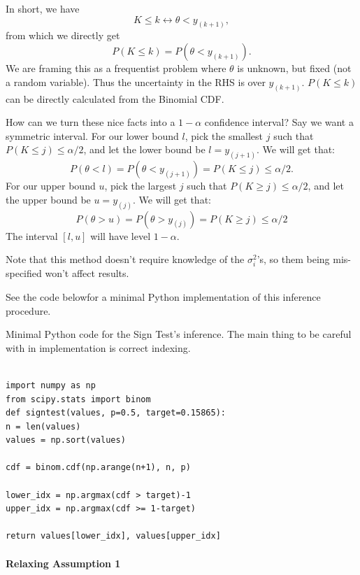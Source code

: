 \documentclass[12pt]{article}
\begin{document}
In short, we have
\begin{equation*}K\leq k\leftrightarrow \theta< y_{(k+1)},\end{equation*}
from which we directly get
\begin{equation*}P(K\leq k)=P(\theta<y_{(k+1)}).\end{equation*}
We are framing this as a frequentist problem where $\theta$ is unknown, but fixed (not a random variable). Thus the uncertainty in the RHS is over $y_{(k+1)}$. $P(K\leq k)$ can be directly calculated from the Binomial CDF.

How can we turn these nice facts into a $1-\alpha$ confidence interval? Say we want a symmetric interval. For our lower bound $l$, pick the smallest $j$ such that $P(K\leq j)\leq \alpha/2$, and let the lower bound be $l=y_{(j+1)}$. We will get that:
\begin{equation*}P(\theta<l)=P(\theta<y_{(j+1)})=P(K\leq j)\leq \alpha/2 .\end{equation*}
For our upper bound $u$, pick the largest $j$ such that $P(K\geq j)\leq \alpha/2$, and let the upper bound be $u=y_{(j)}$. We
will get that:
\begin{equation*}P(\theta>u)=P(\theta>y_{(j)})=P(K\geq j)\leq \alpha/2\end{equation*}
The interval $[l,u]$ will have level $1-\alpha$.

Note that this method doesn't require knowledge of the $\sigma_i^2$'s, so them being mis-specified won't affect results.

See the code belowfor a minimal Python implementation of this inference procedure.

\begin{listing}[h]
\caption{Minimal Python code for the Sign Test's inference. The main thing to be careful with in implementation is correct indexing.}
\smaller
\begin{verbatim}

import numpy as np
from scipy.stats import binom
def signtest(values, p=0.5, target=0.15865):
n = len(values)
values = np.sort(values)

cdf = binom.cdf(np.arange(n+1), n, p)

lower_idx = np.argmax(cdf > target)-1
upper_idx = np.argmax(cdf >= 1-target)

return values[lower_idx], values[upper_idx]
\end{verbatim}
\end{listing}


\paragraph{Relaxing Assumption 1}\label{relaxing-assumption-1}
\end{document}
